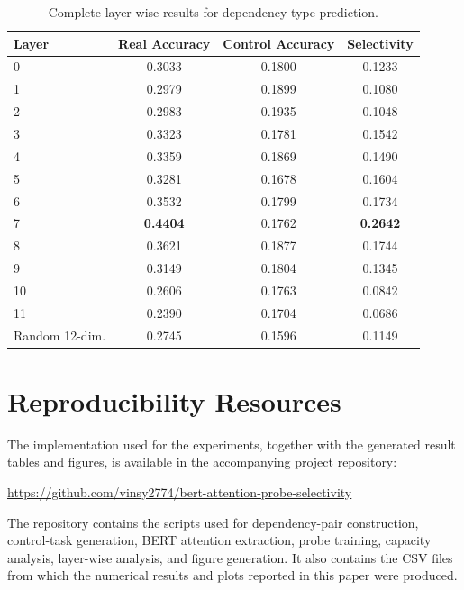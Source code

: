 \documentclass[12pt,a4paper]{article}
\begin{document}
\begin{table}[htbp]
\centering
\small
\caption{Complete layer-wise results for dependency-type prediction.}
\label{tab:appendix-type-layers}

\begin{tabular}{lccc}
\toprule
\textbf{Layer} & \textbf{Real Accuracy} & \textbf{Control Accuracy} & \textbf{Selectivity} \\
\midrule
0  & 0.3033 & 0.1800 & 0.1233 \\
1  & 0.2979 & 0.1899 & 0.1080 \\
2  & 0.2983 & 0.1935 & 0.1048 \\
3  & 0.3323 & 0.1781 & 0.1542 \\
4  & 0.3359 & 0.1869 & 0.1490 \\
5  & 0.3281 & 0.1678 & 0.1604 \\
6  & 0.3532 & 0.1799 & 0.1734 \\
7  & \textbf{0.4404} & 0.1762 & \textbf{0.2642} \\
8  & 0.3621 & 0.1877 & 0.1744 \\
9  & 0.3149 & 0.1804 & 0.1345 \\
10 & 0.2606 & 0.1763 & 0.0842 \\
11 & 0.2390 & 0.1704 & 0.0686 \\
\midrule
Random 12-dim. & 0.2745 & 0.1596 & 0.1149 \\
\bottomrule
\end{tabular}

\end{table}


\clearpage

\section{Reproducibility Resources}

The implementation used for the experiments, together with the generated result tables and figures, is available in the accompanying project repository:

\begin{center}
\url{https://github.com/vinsy2774/bert-attention-probe-selectivity}
\end{center}

The repository contains the scripts used for dependency-pair construction, control-task generation, BERT attention extraction, probe training, capacity analysis, layer-wise analysis, and figure generation. It also contains the CSV files from which the numerical results and plots reported in this paper were produced.
\end{document}
